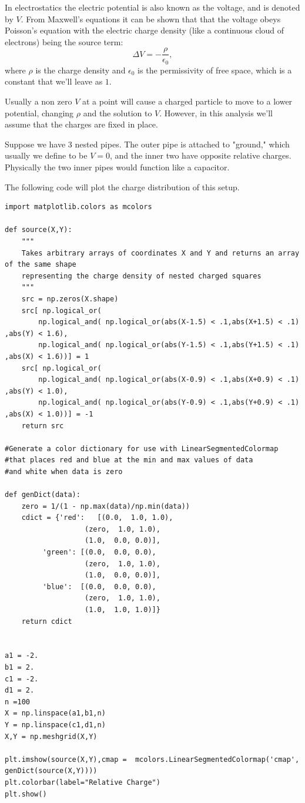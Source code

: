 In electrostatics the electric potential is also known as the voltage, and is denoted by $V.$ 
From Maxwell's equations it can be shown that that the voltage obeys Poisson's equation with the electric charge density (like a continuous cloud of electrons) being the source term: 
\[
 \Delta V = -\frac{\rho}{\epsilon_0},
\]
where $\rho$ is the charge density and $\epsilon_0$ is the permissivity of 
free space, which is a constant that we'll leave as $1$.

Usually a non zero $V$ at a point will cause a charged particle to move to a lower potential, changing $\rho$ and the solution to $V$.
However, in this analysis we'll assume that the charges are fixed in place.

Suppose we have 3 nested pipes.
The outer pipe is attached to "ground," which usually we define to be $V=0$, and the inner two have opposite relative charges.
Physically the two inner pipes would function like a capacitor.

The following code will plot the charge distribution of this setup.
\begin{lstlisting}
import matplotlib.colors as mcolors

def source(X,Y):
    """
    Takes arbitrary arrays of coordinates X and Y and returns an array of the same shape
    representing the charge density of nested charged squares
    """
    src = np.zeros(X.shape)
    src[ np.logical_or(
        np.logical_and( np.logical_or(abs(X-1.5) < .1,abs(X+1.5) < .1) ,abs(Y) < 1.6),
        np.logical_and( np.logical_or(abs(Y-1.5) < .1,abs(Y+1.5) < .1) ,abs(X) < 1.6))] = 1
    src[ np.logical_or(
        np.logical_and( np.logical_or(abs(X-0.9) < .1,abs(X+0.9) < .1) ,abs(Y) < 1.0),
        np.logical_and( np.logical_or(abs(Y-0.9) < .1,abs(Y+0.9) < .1) ,abs(X) < 1.0))] = -1
    return src

#Generate a color dictionary for use with LinearSegmentedColormap
#that places red and blue at the min and max values of data
#and white when data is zero

def genDict(data):
    zero = 1/(1 - np.max(data)/np.min(data))
    cdict = {'red':   [(0.0,  1.0, 1.0),
                   (zero,  1.0, 1.0),
                   (1.0,  0.0, 0.0)],
         'green': [(0.0,  0.0, 0.0),
                   (zero,  1.0, 1.0),
                   (1.0,  0.0, 0.0)],
         'blue':  [(0.0,  0.0, 0.0),
                   (zero,  1.0, 1.0),
                   (1.0,  1.0, 1.0)]}
    return cdict


a1 = -2.
b1 = 2.
c1 = -2.
d1 = 2.
n =100
X = np.linspace(a1,b1,n)
Y = np.linspace(c1,d1,n)
X,Y = np.meshgrid(X,Y)

plt.imshow(source(X,Y),cmap =  mcolors.LinearSegmentedColormap('cmap', genDict(source(X,Y))))
plt.colorbar(label="Relative Charge")
plt.show()
\end{lstlisting}

